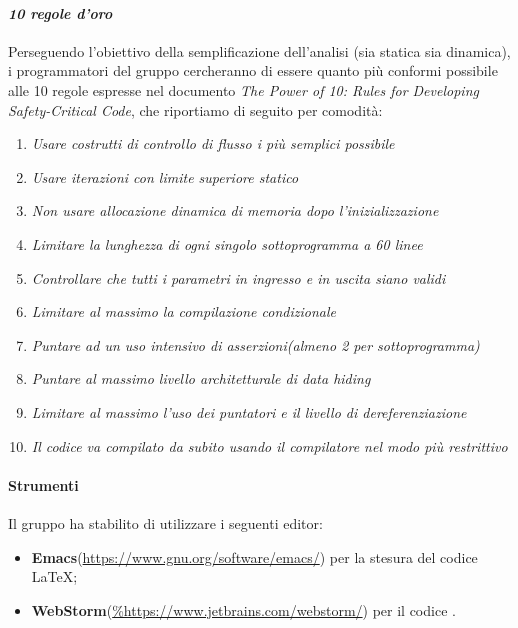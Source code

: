 		\paragraph*{\textit{10 regole d'oro}}
		Perseguendo l'obiettivo della semplificazione dell'analisi (sia statica sia dinamica),
           	i programmatori del gruppo cercheranno di essere quanto più conformi possibile alle 10 regole
           	espresse nel documento \textit{The Power of 10: Rules for Developing Safety-Critical Code}, che riportiamo di seguito per comodità:
                	\begin{enumerate}
                        	\item \textit{Usare costrutti di controllo di flusso i più semplici possibile}
                        	\item \textit{Usare iterazioni con limite superiore statico}
                        	\item \textit{Non usare allocazione dinamica di memoria dopo l'inizializzazione}
                        	\item \textit{Limitare la lunghezza di ogni singolo sottoprogramma a 60 linee}
                        	\item \textit{Controllare che tutti i parametri in ingresso e in uscita siano validi}
                        	\item \textit{Limitare al massimo la compilazione condizionale}
                        	\item \textit{Puntare ad un uso intensivo di asserzioni(almeno 2 per sottoprogramma)}
                        	\item \textit{Puntare al massimo livello architetturale di \textit{data hiding}}
                        	\item \textit{Limitare al massimo l'uso dei puntatori e il livello di dereferenziazione}
                        	\item \textit{Il codice va compilato da subito usando il compilatore nel modo più restrittivo}
			\end{enumerate}

                \paragraph*{Strumenti}
                Il gruppo ha stabilito di utilizzare i seguenti editor:
                \begin{itemize}
                  \item \textbf{Emacs}(\url{https://www.gnu.org/software/emacs/}) per la stesura del codice \LaTeX; 
                  \item \textbf{WebStorm}(\url{%https://www.jetbrains.com/webstorm/}) per il codice \glossaryItem{Javascript}.      
                \end{itemize}
